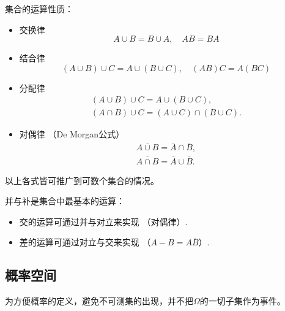 \begin{property}
    集合的运算性质：
    \begin{itemize}
        \item 交换律
              \begin{equation}\label{eq:commutativity_set}
                  A \cup B = B \cup A, \quad AB = BA
              \end{equation}
        \item 结合律
              \begin{equation}
                  (A \cup B) \cup C = A \cup(B \cup C), \quad (AB)C = A(BC)\label{eq:associative_law_set}
              \end{equation}
        \item 分配律
              \begin{gather}
                  (A \cup B) \cup C = A \cup(B \cup C),\label{eq:distributive_law_set1}\\
                  (A \cap B) \cup C = (A \cup C) \cap(B \cup C).\label{eq:distributive_law_set2}
              \end{gather}
        \item 对偶律 （De Morgan公式）
              \begin{gather}
                  \overline{A \cup B} = \overline{A} \cap \overline{B},\label{eq:DeMorgan_law_set1}\\
                  \overline{A \cap B} = \overline{A} \cup \overline{B}.\label{eq:DeMorgan_law_set2}
              \end{gather}
    \end{itemize}
    以上各式皆可推广到可数个集合的情况。
\end{property}


\begin{remark}
    并与补是集合中最基本的运算：
    \begin{itemize}
        \item 交的运算可通过并与对立来实现 （对偶律）.
        \item 差的运算可通过对立与交来实现 （$A - B = A\overline{B}$）.
    \end{itemize}
\end{remark}

\subsection{概率空间}

为方便概率的定义，避免不可测集的出现，并不把$\Omega$的一切子集作为事件。

